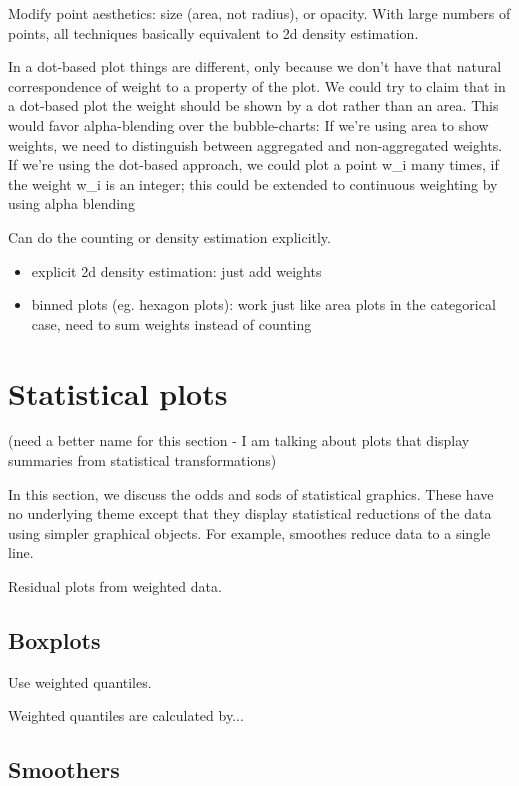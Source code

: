 \documentclass[oneside,letterpaper]{scrartcl}
\begin{document}
Modify point aesthetics: size (area, not radius), or opacity.  With large numbers of points, all techniques basically equivalent to 2d density estimation.  

In a dot-based plot things are different, only because we don't have that natural correspondence of weight to a property of the plot. We could try to claim that in a dot-based plot the weight should be shown by a dot rather than an area. This would favor alpha-blending over the bubble-charts:
If we're using area to show weights, we need to distinguish between aggregated and non-aggregated weights. 
If we're using the dot-based approach, we could plot a point w_i many times, if the weight w_i is an integer;  this could be extended to continuous weighting by using alpha blending

Can do the counting or density estimation explicitly.  

\begin{itemize}
  \item explicit 2d density estimation: just add weights
  \item binned plots (eg. hexagon plots): work just like area plots in the categorical case, need to sum weights instead of counting
\end{itemize}

\section{Statistical plots}\label{sec:statistical_plots}

(need a better name for this section - I am talking about plots that display summaries from statistical transformations)

In this section, we discuss the odds and sods of statistical graphics.  These have no underlying theme except that they display statistical reductions of the data using simpler graphical objects.  For example, smoothes reduce data to a single line.

Residual plots from weighted data.

\subsection{Boxplots}\label{sub:boxplots}

Use weighted quantiles.

Weighted quantiles are calculated by...

\subsection{Smoothers}\label{sub:smoothers}
\end{document}
